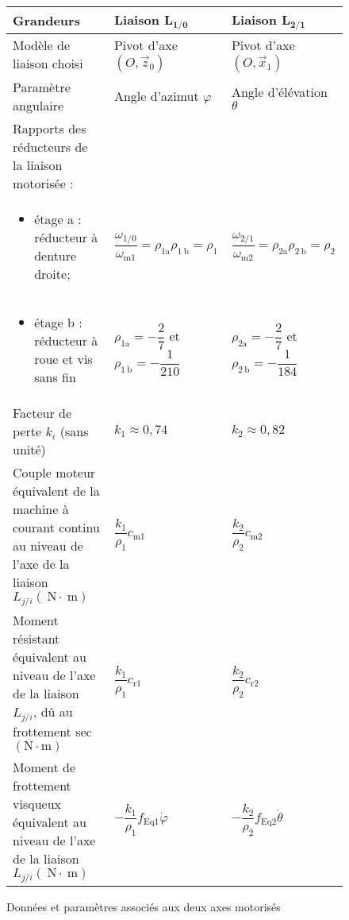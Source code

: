 \begin{figure}[!h]
\centering
\begin{tabular}{p{8cm}ll}
\hline
\textbf{Grandeurs} & \textbf{Liaison} $\boldsymbol{L}_{\mathbf{1 / 0}}$ & \textbf{Liaison} $\boldsymbol{L}_{\mathbf{2} / \mathbf{1}}$ \\
\hline
Modèle de liaison choisi & Pivot d'axe $\left(O, \vec{z}_{0}\right)$ & Pivot d'axe $\left(O, \vec{x}_{1}\right)$ \\

Paramètre angulaire & Angle d'azimut $\varphi$ & Angle d'élévation $\theta$ \\

Rapports des réducteurs de la liaison motorisée : & & \\

\begin{itemize}
\item étage a : réducteur à denture droite;
\end{itemize}
& $\dfrac{\omega_{1 / 0}}{\omega_{\mathrm{m} 1}}=\rho_{1 \mathrm{a}} \rho_{1 \mathrm{~b}}=\rho_{1}$ 
& $\dfrac{\omega_{2 / 1}}{\omega_{\mathrm{m} 2}}=\rho_{2 \mathrm{a}} \rho_{2 \mathrm{~b}}=\rho_{2}$ \\
\begin{itemize}
\item étage b : réducteur à roue et vis sans fin
\end{itemize}
& $\rho_{1 \mathrm{a}}=-\dfrac{2}{7}$ et $\rho_{1 \mathrm{~b}}=-\dfrac{1}{210}$ & 
$\rho_{2 \mathrm{a}}=-\dfrac{2}{7}$ et $\rho_{2 \mathrm{~b}}=-\dfrac{1}{184}$\\

Facteur de perte $k_{i}$ (sans unité) &$k_{1} \approx 0,74$ & $k_{2} \approx 0,82$ \\

Couple moteur équivalent de la machine à courant continu au niveau de l'axe de la liaison $L_{j / i}(\mathrm{~N} \cdot \mathrm{~m})$  &
$\dfrac{k_{1}}{\rho_{1}} c_{\mathrm{m} 1}$ 
& $\dfrac{k_{2}}{\rho_{2}} c_{\mathrm{m} 2}$ \\

Moment résistant équivalent au niveau de l'axe de 
la liaison $L_{j / i}$, dû au frottement sec $(\mathrm{N} \cdot \mathrm{m})$  & 
$\dfrac{k_{1}}{\rho_{1}} c_{\mathrm{r} 1}$ 
& $\dfrac{k_{2}}{\rho_{2}} c_{\mathrm{r} 2}$ \\


Moment de frottement visqueux équivalent au  niveau de l'axe de la liaison $L_{j / i}(\mathrm{~N} \cdot \mathrm{~m})$  & 
$-\dfrac{k_{1}}{\rho_{1}} f_{\mathrm{Eq} 1} \dot{\varphi}$ & 
$-\dfrac{k_{2}}{\rho_{2}} f_{\mathrm{Eq} 2} \dot{\theta}$ \\
\hline
\end{tabular}
\caption{Données et paramètres associés aux deux axes motorisés \label{CCS_MP_2017:fig_11}}
\end{figure}
\fi


